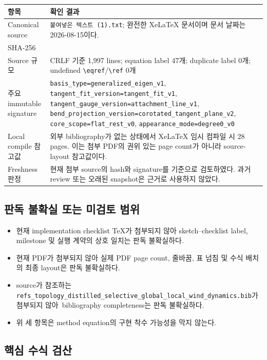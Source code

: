 \documentclass[11pt]{article}
\newcommand{\code}[1]{\texttt{\small #1}}
\begin{document}
\begin{tabularx}{\textwidth}{L{0.27\textwidth}Y}
\toprule
항목 & 확인 결과 \\
\midrule
Canonical source & \code{붙여넣은 텍스트 (1).txt}; 완전한 XeLaTeX 문서이며 문서 날짜는 2026-08-15이다. \\
SHA-256 & \texttt{} \\
Source 규모 & CRLF 기준 1,997 lines; equation label 47개; duplicate label 0개; undefined \code{\textbackslash eqref}/\code{\textbackslash ref} 0개 \\
주요 immutable signature & \code{basis\_type=generalized\_eigen\_v1}, \code{tangent\_fit\_version=tangent\_fit\_v1}, \code{tangent\_gauge\_version=attachment\_line\_v1}, \code{bend\_projection\_version=corotated\_tangent\_plane\_v2}, \code{core\_scope=flat\_rest\_v0}, \code{appearance\_mode=degree0\_v0} \\
Local compile 참고값 & 외부 bibliography가 없는 상태에서 XeLaTeX 임시 컴파일 시 28 pages. 이는 첨부 PDF의 권위 있는 page count가 아니라 source-layout 참고값이다. \\
Freshness 판정 & 현재 첨부 source의 hash와 signature를 기준으로 검토하였다. 과거 review 또는 오래된 snapshot은 근거로 사용하지 않았다. \\
\bottomrule
\end{tabularx}

\subsection{판독 불확실 또는 미검토 범위}

\begin{itemize}
  \item 현재 implementation checklist TeX가 첨부되지 않아 sketch--checklist label, milestone 및 실행 계약의 상호 일치는 판독 불확실하다.
  \item 현재 PDF가 첨부되지 않아 실제 PDF page count, 줄바꿈, 표 넘침 및 수식 배치의 최종 layout은 판독 불확실하다.
  \item source가 참조하는 {\footnotesize\nolinkurl{refs_topology_distilled_selective_global_local_wind_dynamics.bib}}가 첨부되지 않아\ bibliography completeness는 판독 불확실하다.
  \item 위 세 항목은 method equation의 구현 착수 가능성을 막지 않는다.
\end{itemize}

\subsection{핵심 수식 검산}
\end{document}
